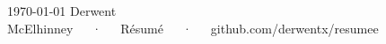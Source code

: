 \documentclass[11pt, a4paper]{derwent-cv}
\begin{document}
\makedercvheader[C]

\makecvfooter
  {\today}
  {Derwent McElhinney~~~·~~~Résumé~~~·~~~github.com/derwentx/resumee}
  {\thepage}







% 
% 
% 




\end{document}
